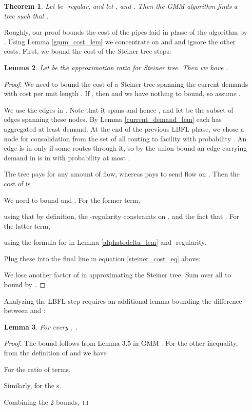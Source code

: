 \documentclass[11pt]{article}
\newtheorem{thm}{Theorem}[section]
\newtheorem{lem}[thm]{Lemma}
\begin{document}
\begin{thm} \label{gmm_thm}
Let  be -regular, and let , and .  Then the GMM algorithm finds a tree  such that .
\end{thm}

Roughly, our proof bounds the cost of the pipes laid in phase  of the algorithm by .  Using Lemma \ref{gmm_cost_lem} we concentrate on  and  and ignore the other costs.  
First, we bound the cost of the Steiner tree steps:

\begin{lem} 
Let  be the approximation ratio for Steiner tree.  Then we have .\label{steiner_cost_lem}
\end{lem}
\begin{proof}
We need to bound the cost of a Steiner tree spanning the current demands  with cost per unit length .  If , then  and we have nothing to bound, so assume .

We use the edges in .  Note that it spans  and hence , and let  be the subset of edges spanning these nodes.  
By Lemma \ref{current_demand_lem} each  has aggregated at least  demand.  At the end of the previous LBFL phase, we chose a node  for consolidation from the set of all  routing to facility  with probability .  An edge is in  only if some  routes through it, so by the union bound an edge carrying  demand in  is in  with probability at most .

The tree  pays  for any amount of flow, whereas  pays  to send  flow on .  Then the cost of  is


We need to bound  and .  For the former term, 

using that  by definition, the -regularity constraints on , and the fact that .
For the latter term,

using the formula for  in Lemma \ref{alphatodelta_lem} and -regularity.

Plug these into the final line in equation \eqref{steiner_cost_eq} above:


We lose another factor of  in approximating the Steiner tree.  Sum over all  to bound  by .
\end{proof}

Analyzing the LBFL step requires an additional lemma bounding the difference between  and :

\begin{lem}  For every , .
\label{b_g_lem}
\end{lem}

\begin{proof}
The bound  follows from Lemma 3.5 in GMM \cite{guha2001cfa}.  For the other inequality, from the definition of  and  we have

For the ratio of  terms,

Similarly, for the s,

Combining the 2 bounds,

\end{proof}
\end{document}
